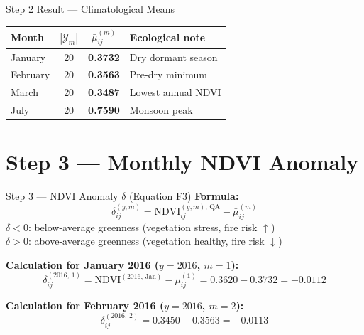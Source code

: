 \documentclass[12pt, a4paper]{article}
\begin{document}
\begin{resultbox}{Step 2 Result --- Climatological Means}
\begin{center}
\begin{tabular}{lccl}
\toprule
\textbf{Month} & \textbf{$|\mathcal{Y}_m|$} &
\textbf{$\bar{\mu}_{ij}^{(m)}$} & \textbf{Ecological note} \\
\midrule
January  & 20 & \textbf{0.3732} & Dry dormant season \\
February & 20 & \textbf{0.3563} & Pre-dry minimum \\
March    & 20 & \textbf{0.3487} & Lowest annual NDVI \\
July     & 20 & \textbf{0.7590} & Monsoon peak \\
\bottomrule
\end{tabular}
\end{center}
\end{resultbox}

\section{Step 3 --- Monthly NDVI Anomaly}
\label{sec:step3}

\begin{stepbox}{Step 3 --- NDVI Anomaly $\delta$ (Equation F3)}
\textbf{Formula:}
\begin{equation}
  \delta_{ij}^{(y,m)} =
  \mathrm{NDVI}_{ij}^{(y,m),\,\mathrm{QA}} - \bar{\mu}_{ij}^{(m)}
  \tag{F3}
\end{equation}
$\delta < 0$: below-average greenness (vegetation stress, fire risk $\uparrow$)\\
$\delta > 0$: above-average greenness (vegetation healthy, fire risk $\downarrow$)
\end{stepbox}

\textbf{Calculation for January 2016 ($y=2016$, $m=1$):}
\begin{equation}
  \delta_{ij}^{(2016,\,1)} =
  \mathrm{NDVI}^{(2016,\,\mathrm{Jan})} - \bar{\mu}_{ij}^{(1)}
  = 0.3620 - 0.3732 = \mathbf{-0.0112}
  \label{eq:anom_jan16}
\end{equation}

\textbf{Calculation for February 2016 ($y=2016$, $m=2$):}
\begin{equation}
  \delta_{ij}^{(2016,\,2)} =
  0.3450 - 0.3563 = \mathbf{-0.0113}
  \label{eq:anom_feb16}
\end{equation}
\end{document}
